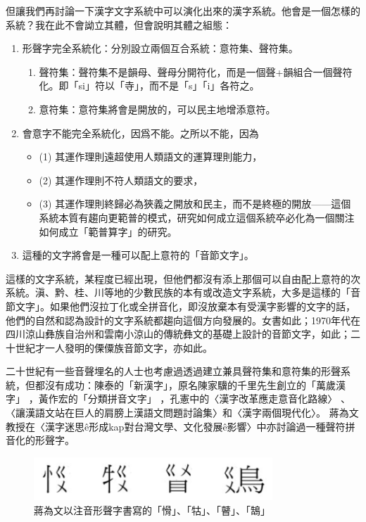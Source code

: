\documentclass[a5paper, 10pt, openany]{book} %
\begin{document}
但讓我們再討論一下漢字文字系統中可以演化出來的漢字系統。他會是一個怎樣的系統？我在此不會詏立其體，但會說明其體之組態：

\begin{enumerate}
  \item 形聲字完全系統化：分別設立兩個互合系統：意符集、聲符集。
  \begin{enumerate}
      \item 聲符集：聲符集不是韻母、聲母分開符化，而是一個聲+韻組合一個聲符化。即「si」符以「寺」，而不是「s」「i」各符之。
      \item 意符集：意符集將會是開放的，可以民主地增添意符。
  \end{enumerate}
  
  \item 會意字不能完全系統化，因爲不能。之所以不能，因為
  \begin{itemize}
      \item (1) 其運作理則遠超使用人類語文的運算理則能力，
      \item (2) 其運作理則不符人類語文的要求，
      \item (3) 其運作理則終歸必為狹義之開放和民主，而不是終極的開放——這個系統本質有趨向更範普的模式，研究如何成立這個系統卒必化為一個關注如何成立「範普算字」的研究。
  \end{itemize}
  
  \item 這種的文字將會是一種可以配上意符的「音節文字」。
\end{enumerate}


這樣的文字系統，某程度已經出現，但他們都沒有添上那個可以自由配上意符的次系統。滇、黔、桂、川等地的少數民族的本有或改造文字系統，大多是這樣的「音節文字」。如果他們沒拉丁化或全拼音化，即沒放棄本有受漢字影響的文字的話，他們的自然和認為設計的文字系統都趨向這個方向發展的。女書如此；1970年代在四川涼山彝族自治州和雲南小涼山的傳統彝文的基礎上設計的音節文字，如此；二十世紀才一人發明的傈僳族音節文字，亦如此。 

二十世紀有一些音聲埋名的人士也考慮過透過建立兼具聲符集和意符集的形聲系統，但都沒有成功：陳泰的「新漢字」，原名陳家驥的千里先生創立的「萬歲漢字」 ，黃作宏的「分類拼音文字」 ，孔憲中的〈漢字改革應走意音化路線〉 、〈讓漢語文站在巨人的肩膀上漢語文問題討論集〉和〈漢字兩個現代化〉。 蔣為文教授在〈漢字迷思ê形成kap對台灣文學、文化發展ê影響〉中亦討論過一種聲符拼音化的形聲字。 


\begin{figure}[h]
  \centering
  \includegraphics[width=0.8\textwidth]{./images/bopomofo_composed.png}
  \caption{蔣為文以注音形聲字書寫的「愲」、「牯」、「瞽」、「鵠」}
\end{figure}
\end{document}
